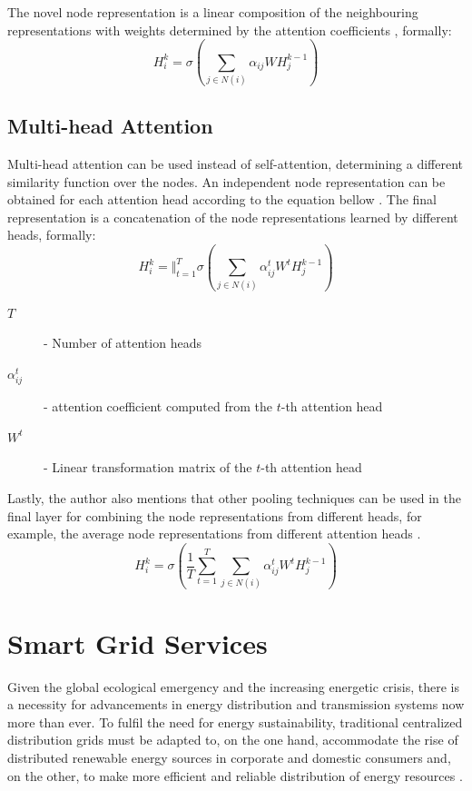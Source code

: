 The novel node representation is a linear composition of the neighbouring representations with weights determined by the attention coefficients \cite{velickovicGraphAttentionNetworks2018, tangGraphNeuralNetworks2022}, formally:
\begin{equation}
	H^k_i = \sigma(\sum_{j \in N(i)} \alpha_{ij} W H^{k - 1}_j) 
\end{equation}


\subsection*{Multi-head Attention}

Multi-head attention can be used instead of self-attention, determining a different similarity function over the nodes. An independent node representation can be obtained for each attention head according to the equation bellow \cite{velickovicGraphAttentionNetworks2018, tangGraphNeuralNetworks2022}. The final representation is a concatenation of the node representations learned by different heads, formally:
$$ H^k_i = \Big\Vert^T_{t=1} \sigma(\sum_{j \in N(i)} \alpha^t_{ij} W^t H^{k-1}_j)$$

\begin{description}
	\item[$T$] - Number of attention heads 
	\item[$\alpha^t_{ij}$] - attention coefficient computed from the $t$-th attention head 
	\item[$W^t$] - Linear transformation matrix of the $t$-th attention head 
\end{description}

Lastly, the author also mentions that other pooling techniques can be used in the final layer for combining the node representations from different heads, for example, the average node representations from different attention heads \cite{velickovicGraphAttentionNetworks2018, tangGraphNeuralNetworks2022}.
\begin{equation}
	H^k_i = \sigma(\frac{1}{T} \sum^T_{t = 1} \sum_{j \in N(i)} \alpha^t_{ij} W^t H^{k-1}_j)
\end{equation}


\section{Smart Grid Services} \label{sec:back-smart-grid}

Given the global ecological emergency and the increasing energetic crisis, there is a necessity for advancements in energy distribution and transmission systems now more than ever. To fulfil the need for energy sustainability, traditional centralized distribution grids must be adapted to, on the one hand, accommodate the rise of distributed renewable energy sources in corporate and domestic consumers and, on the other, to make more efficient and reliable distribution of energy resources \cite{farhangiPathSmartGrid2010, vijayapriyaSmartGridOverview2011}. \par


